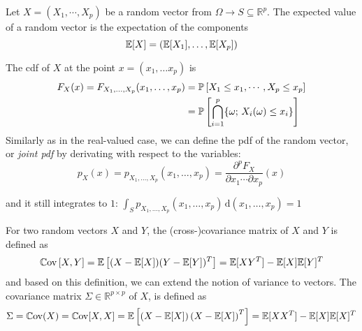 \documentclass[../../Main_ManuscritThese.tex]{subfiles}
\begin{document}
\begin{definition}
 \label{def:joint_marginal_cond_densities}
 Let $X=(X_1,\cdots,X_p)$ be a random vector from $\Omega \rightarrow S\subseteq\mathbb{R}^p$.
 The expected value of a random vector is the expectation of the components
 \begin{equation}
\mathbb{E}[X] = \left(\mathbb{E}[X_1],\dots,\mathbb{E}[X_p]\right)
\end{equation}

The cdf of $X$ at the point $x=(x_1,\dots x_p)$ is
   \begin{align}
     \label{eq:def_cdf_multi}
     F_{X}(x) = F_{X_1,\dots, X_p}(x_1,\dots, x_p) &= \mathbb{P}\left[X_1 \leq x_1, \cdots, X_p\leq x_p\right]\\
                                                   &= \mathbb{P}\left[\bigcap_{i=1}^p \{\omega;\,X_i(\omega) \leq x_i\}\right] \nonumber
  \end{align}
  Similarly as in the real-valued case, we can define the pdf of the
  random vector, or \emph{joint pdf} by derivating with respect to the
  variables:
  \begin{equation}
    p_{X}(x)= p_{X_1,\dots, X_p}(x_1,\dots, x_p) =\frac{\partial^p F_X}{\partial x_1 \cdots \partial x_p}(x)
  \end{equation}
  
  and it still integrates to $1$:
  $\int_{S}p_{X_1,\dots, X_p}(x_1,\dots, x_p)\,\mathrm{d}(x_1,\dots,
  x_p)=1$

  For two random vectors $X$ and $Y$, the (cross-)covariance matrix of
  $X$ and $Y$ is defined as
  \begin{equation}
    \mathbb{C}\mathrm{ov}\left[X,Y\right] = \mathbb{E}\left[(X-\mathbb{E}[X])(Y - \mathbb{E}[Y])^T\right] = \mathbb{E}[XY^T] - \mathbb{E}[X]\mathbb{E}[Y]^T
  \end{equation}
  and based on this definition, we can extend the notion of variance
  to vectors. The covariance matrix
  $\Sigma \in \mathbb{R}^{p\times p}$ of $X$, is defined as 
  \begin{equation}
    \Sigma = \mathbb{C}\mathrm{ov}(X)=\mathbb{C}\mathrm{ov}[X,X]= \mathbb{E}\left[\left(X - \mathbb{E}[X]\right)\left(X-\mathbb{E}[X]\right)^T\right] = \mathbb{E}[XX^T] - \mathbb{E}[X]\mathbb{E}[X]^T
  \end{equation}



\end{definition}
\end{document}
